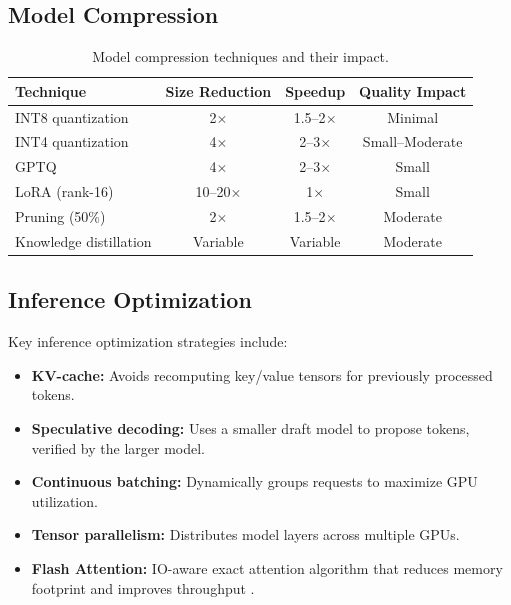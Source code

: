 \documentclass[
    language=english,
    doctype=review-article,
    institution=none,
]{../../omnilatex}
\begin{document}
\subsection{Model Compression}

\begin{table}[htbp]
    \centering
    \caption{Model compression techniques and their impact.}
    \label{tab:compression}
    \begin{tabular}{@{}lccc@{}}
        \toprule
        Technique & Size Reduction & Speedup & Quality Impact \\
        \midrule
        INT8 quantization & 2$\times$ & 1.5--2$\times$ & Minimal \\
        INT4 quantization & 4$\times$ & 2--3$\times$ & Small--Moderate \\
        GPTQ & 4$\times$ & 2--3$\times$ & Small \\
        LoRA (rank-16) & 10--20$\times$ & 1$\times$ & Small \\
        Pruning (50\%) & 2$\times$ & 1.5--2$\times$ & Moderate \\
        Knowledge distillation & Variable & Variable & Moderate \\
        \bottomrule
    \end{tabular}
\end{table}

\subsection{Inference Optimization}

Key inference optimization strategies include:
\begin{itemize}
    \item \textbf{KV-cache:} Avoids recomputing key/value tensors for
          previously processed tokens.
    \item \textbf{Speculative decoding:} Uses a smaller draft model to
          propose tokens, verified by the larger model.
    \item \textbf{Continuous batching:} Dynamically groups requests to
          maximize GPU utilization.
    \item \textbf{Tensor parallelism:} Distributes model layers across
          multiple GPUs.
    \item \textbf{Flash Attention:} IO-aware exact attention algorithm that
          reduces memory footprint and improves throughput \cite{dao2022flashattention}.
\end{itemize}
\end{document}
